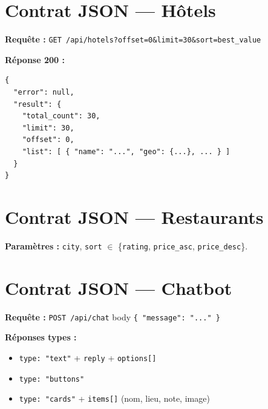\section{Contrat JSON — Hôtels}

\textbf{Requête :} \texttt{GET /api/hotels?offset=0\&limit=30\&sort=best\_value}

\textbf{Réponse 200 :}
\begin{lstlisting}[language={},caption={Structure JSON}]
{
  "error": null,
  "result": {
    "total_count": 30,
    "limit": 30,
    "offset": 0,
    "list": [ { "name": "...", "geo": {...}, ... } ]
  }
}
\end{lstlisting}

\section{Contrat JSON — Restaurants}

\textbf{Paramètres :} \texttt{city}, \texttt{sort} $\in$ \{\texttt{rating}, \texttt{price\_asc}, \texttt{price\_desc}\}.

\section{Contrat JSON — Chatbot}

\textbf{Requête :} \texttt{POST /api/chat} body \texttt{\{ "message": "..." \}}

\textbf{Réponses types :}
\begin{itemize}
  \item \texttt{type: "text"} + \texttt{reply} + \texttt{options[]}
  \item \texttt{type: "buttons"}
  \item \texttt{type: "cards"} + \texttt{items[]} (nom, lieu, note, image)
\end{itemize}
